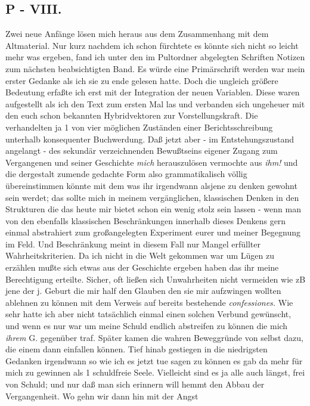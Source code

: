 \documentclass[
]{article}
\author{}
\date{\vspace{-2.5em}}
\begin{document}
\subsection{P - VIII.}\label{p---viii.}

Zwei neue Anfänge lösen mich heraus aus dem Zusammenhang mit dem
Altmaterial. Nur kurz nachdem ich schon fürchtete es könnte sich nicht
so leicht mehr was ergeben, fand ich unter den im Pultordner abgelegten
Schriften Notizen zum nächsten beabsichtigten Band. Es würde eine
Primärschrift werden war mein erster Gedanke als ich sie zu ende gelesen
hatte. Doch die ungleich größere Bedeutung erfaßte ich erst mit der
Integration der neuen Variablen. Diese waren aufgestellt als ich den
Text zum ersten Mal las und verbanden sich ungeheuer mit den euch schon
bekannten Hybridvektoren zur Vorstellungskraft. Die verhandelten ja 1
von vier möglichen Zuständen einer Berichtsschreibung unterhalb
konsequenter Buchwerdung. Daß jetzt aber - im Entstehungszustand
angelangt - des sekundär verzeichnenden Bewußtseins eigener Zugang zum
Vergangenen und seiner Geschichte \emph{mich} herauszulösen vermochte
aus \emph{ihm! }und die dergestalt zumende gedachte Form also
grammatikalisch völlig übereinstimmen könnte mit dem was ihr irgendwann
alsjene zu denken gewohnt sein werdet; das sollte mich in meinem
vergänglichen, klassischen Denken in den Strukturen die das heute mir
bietet schon ein wenig stolz sein lassen - wenn man von den ebenfalls
klassischen Beschränkungen innerhalb dieses Denkens gern einmal
abstrahiert zum großangelegten Experiment eurer und meiner Begegnung im
Feld. Und Beschränkung meint in diesem Fall nur Mangel erfüllter
Wahrheitskriterien. Da ich nicht in die Welt gekommen war um Lügen zu
erzählen mußte sich etwas aus der Geschichte ergeben haben das ihr meine
Berechtigung erteilte. Sicher, oft ließen sich Unwahrheiten nicht
vermeiden wie zB jene der j. Geburt die mir half den Glauben den sie mir
aufzwingen wollten ablehnen zu können mit dem Verweis auf bereits
bestehende \emph{confessiones. }Wie sehr hatte ich aber nicht
tatsächlich einmal einen solchen Verbund gewünscht, und wenn es nur war
um meine Schuld endlich abstreifen zu können die mich \emph{ihrem }G.
gegenüber traf. Später kamen die wahren Beweggründe von selbst dazu, die
einem dann einfallen können. Tief hinab gestiegen in die niedrigsten
Gedanken irgendwann so wie ich es jetzt tue sagen zu können es gab da
mehr für mich zu gewinnen als 1 schuldfreie Seele. Vielleicht sind es ja
alle auch längst, frei von Schuld; und nur daß man sich erinnern will
hemmt den Abbau der Vergangenheit. Wo gehn wir dann hin mit der Angst
\end{document}
